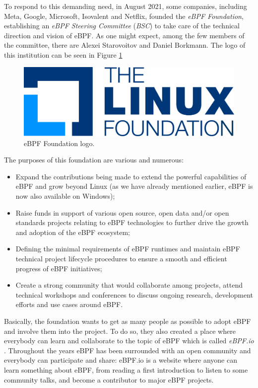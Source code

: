 To respond to this demanding need, in August 2021, some companies, including Meta, Google, Microsoft, Isovalent and Netflix, founded the \textit{eBPF Foundation}, establishing an \textit{eBPF Steering Committee} (\textit{BSC}) to take care of the technical direction and vision of eBPF.
As one might expect, among the few members of the committee, there are Alexei Starovoitov and Daniel Borkmann.
The logo of this institution can be seen in Figure \ref{fig:eBPF_foundation_logo}

\begin{figure}[h]
	\centering
	\includegraphics[width=0.7\linewidth]{images/History/lf-stacked-color.png}
	\caption{eBPF Foundation logo.}
	\label{fig:eBPF_foundation_logo}
\end{figure}

The purposes of this foundation are various and numerous:

\begin{itemize}
	\item 
		Expand the contributions being made to extend the powerful capabilities of eBPF and grow beyond Linux (as we have already mentioned earlier, eBPF is now also available on Windows);
	\item 
		Raise funds in support of various open source, open data and/or open standards projects relating to eBPF technologies to further drive the growth and adoption of the eBPF ecosystem;
	\item 
		Defining the minimal requirements of eBPF runtimes and maintain eBPF technical project lifecycle procedures to ensure a smooth and efficient progress of eBPF initiatives;
	\item 
		Create a strong community that would collaborate among projects, attend technical workshops and conferences to discuss ongoing research, development efforts and use cases around eBPF.
\end{itemize} 

Basically, the foundation wants to get as many people as possible to adopt eBPF and involve them into the project.
To do so, they also created a place where everybody can learn and collaborate to the topic of eBPF which is called \textit{eBPF.io} \cite{eBPFioWebsite}.
Throughout the years eBPF has been surrounded with an open community and everybody can participate and share: eBPF.io is a website where anyone can learn something about eBPF, from reading a first introduction to listen to some community talks, and become a contributor to major eBPF projects.

